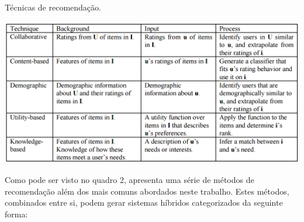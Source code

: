 \documentclass[12pt, openright, oneside, a4paper, brazil]{abntex2}
\begin{document}
\begin{quadro}[h!tp]
	\caption{\label{recommender_systems}Técnicas de recomendação.}
	\begin{center}
		\includegraphics[scale=0.6]{images/recommender_systems.png}
	\end{center}
\end{quadro}

Como pode ser visto no quadro 2,  apresenta uma série de métodos de recomendação além dos mais comuns abordados neste trabalho. Estes métodos, combinados entre si, podem gerar sistemas híbridos categorizados da seguinte forma:
\end{document}
